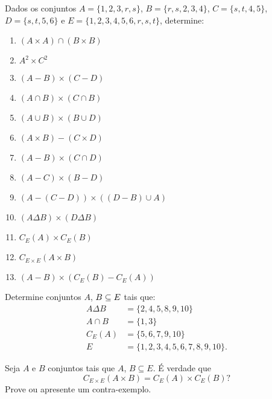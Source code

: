 \documentclass[12pt]{exam}
\begin{document}
\questao{} Dados os conjuntos $A = \{1, 2, 3, r, s\}$, $B = \{r, s, 2, 3, 4\}$, $C = \{s, t, 4, 5\}$, $D = \{s, t, 5, 6\}$ e $E = \{1, 2, 3, 4, 5, 6, r, s, t\}$, determine:
\begin{multicols}{2}
    \begin{enumerate}[label={\alph*})]
        \item $(A \times A) \cap (B \times B)$

        \item $A^2 \times C^2$

        \item $(A - B) \times (C - D)$

        \item $(A \cap B) \times (C \cap B)$

        \item $(A \cup B) \times (B \cup D)$

        \item $(A \times B) - (C \times D)$

        \item $(A - B) \times (C \cap D)$

        \item $(A - C) \times (B - D)$

        \item $(A - (C - D)) \times ((D - B) \cup A)$

        \item $(A \Delta B) \times (D \Delta B)$

        \item $C_E(A) \times C_E(B)$

        \item $C_{E\times E}(A \times B)$

        \item $(A - B) \times (C_E(B) - C_E(A))$
    \end{enumerate}

\end{multicols}

\questao{} Determine conjuntos $A$, $B \subseteq E$ tais que:
\begin{align*}
    A \Delta B &= \{2, 4, 5, 8, 9, 10\}\\
    A \cap B &= \{1, 3\}\\
    C_E(A) &= \{5, 6, 7, 9, 10\}\\
    E &= \{1, 2, 3, 4, 5, 6, 7, 8, 9, 10\}.
\end{align*}

\questao{} Seja $A$ e $B$ conjuntos tais que $A$, $B \subseteq E$. É verdade que
\[
    C_{E\times E}(A \times B) = C_E(A) \times C_E(B)?
\]
Prove ou apresente um contra-exemplo.
\end{document}
